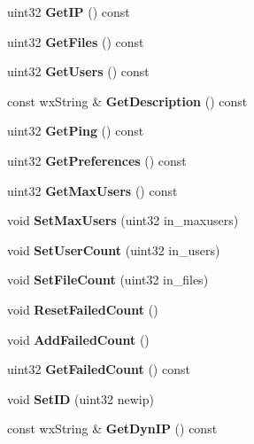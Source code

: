 \begin{DoxyCompactItemize}
\item 
uint32 {\bfseries GetIP} () const \label{classCServer_a8125b321871b7102cd67cf02d130d22e}

\item 
uint32 {\bfseries GetFiles} () const \label{classCServer_a186bb14e149f2ade0761530d3c47efb9}

\item 
uint32 {\bfseries GetUsers} () const \label{classCServer_a6e8f05a5747083de44b57e5aa5c86836}

\item 
const wxString \& {\bfseries GetDescription} () const \label{classCServer_a7d0a0a8c70b3d4c8f88c51107d6b62b2}

\item 
uint32 {\bfseries GetPing} () const \label{classCServer_a2a8ce3d97a61ce697fe72631418cc611}

\item 
uint32 {\bfseries GetPreferences} () const \label{classCServer_acbfffcef8e627dae6b5a6cdd088c52a2}

\item 
uint32 {\bfseries GetMaxUsers} () const \label{classCServer_ae4cd4bb356711be5a036d3c2ed865ef3}

\item 
void {\bfseries SetMaxUsers} (uint32 in\_\-maxusers)\label{classCServer_a2c26f0d6d6549a95d7a223542d547b32}

\item 
void {\bfseries SetUserCount} (uint32 in\_\-users)\label{classCServer_a4c8cffa3248c5889ed4793c2299a511c}

\item 
void {\bfseries SetFileCount} (uint32 in\_\-files)\label{classCServer_a77b866894811a22fb1b1e38df84d7d32}

\item 
void {\bfseries ResetFailedCount} ()\label{classCServer_a4fededac7b0e86d66c73de7bd70d778b}

\item 
void {\bfseries AddFailedCount} ()\label{classCServer_a152191099b553b10ddab66a0dad40e65}

\item 
uint32 {\bfseries GetFailedCount} () const \label{classCServer_aeb377303e93e6828abb2e0d18422b62c}

\item 
void {\bfseries SetID} (uint32 newip)\label{classCServer_af43e1ed01f576e51d932dbf7f6386a05}

\item 
const wxString \& {\bfseries GetDynIP} () const \label{classCServer_a3008da9dd5209bbfd018a952ff2625e6}


\end{DoxyCompactItemize}
